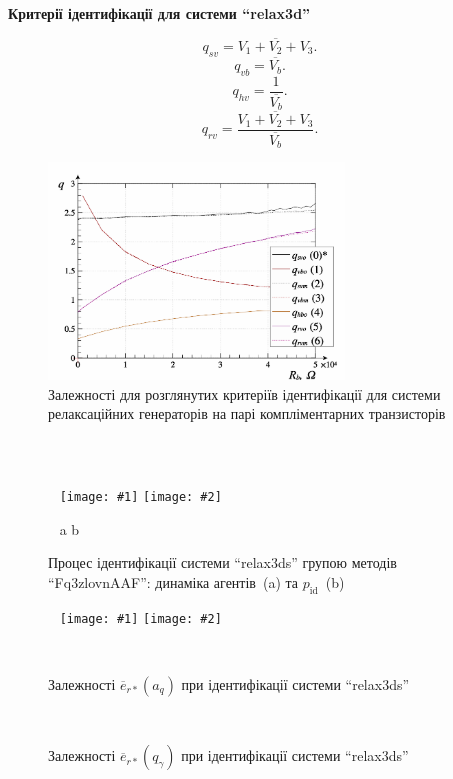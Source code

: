 \documentclass[14pt,handout,utf8]{beamer}
\newlength\DDP
\newcommand{\Xhead}[1]{
 \begin{center}%
      \textbf{#1}%
 \end{center}%
}
\newcommand{\ABlbl}{%
  \vspace{-2.9ex}
  \begin{center}
    ~ \hfill a \hfill\hfill b \hfill ~
  \end{center}
  \vspace{-2.0ex}
}
\newcommand{\PicDouble}[2]{%
 \begin{center}
    ~ \hfill
    \texttt{[image: \#1]}
    \hfill
    \texttt{[image: \#2]}
    \hfill ~
  \end{center}
  \ABlbl
}
\newcommand{\PicDoubleNL}[2]{%
 \begin{center}
    ~ \hfill
    \texttt{[image: \#1]}
    \hfill
    \texttt{[image: \#2]}
    \hfill ~
  \end{center}
}
\newcommand{\TextDouble}[2]{%
 \begin{center}
    ~ \hfill
    \parbox[t]{\DDP}{#1}
    \hfill
    \parbox[t]{\DDP}{#2}
    \hfill ~
  \end{center}
}
\begin{document}
\begin{frame}
  \frametitle{~}

  \Xhead{Критерії ідентифікації для системи ``relax3d''}

\begin{equation}
  q_{sv} = \overline{V_1+V_2+V_3} .
  \label{atu:eq:q_sv_relax}
\end{equation}
%
\begin{equation}
  q_{vb} = \overline{V_b} .
  \label{atu:eq:q_vb_relax}
\end{equation}
%
\begin{equation}
  q_{hv} = \frac{1}{\overline{V_b}} .
  \label{atu:eq:q_hb_relax}
\end{equation}
%
\begin{equation}
  q_{rv} = \frac{\overline{V_1+V_2+V_3}}{\overline{V_b}}.
  \label{atu:eq:q_rv_relax}
\end{equation}

  \begin{figure}
    \includegraphics[width=0.7\textwidth]{../p7/p/relax3d_read_q-p_q1.png}
    \caption{Залежності для розглянутих критеріїв ідентифікації для системи релаксаційних генераторів на парі компліментарних транзисторів}
  \end{figure}


\end{frame}



\begin{frame}
  \frametitle{~}

  \Xhead{}

  \begin{figure}
    \PicDouble{../p7/p/relax3ds_read_id2_0-p_p_cr.png}{../p7/p/relax3ds_read_id2_0-p_pp_cr.png}
    \caption{Процес ідентифікації системи ``relax3ds'' групою методів ``Fq3zlovnAAF'': динаміка агентів~(a) та $p_\mathrm{id}$~(b)}
  \end{figure}

  \begin{figure}
    \PicDoubleNL{../p7/p/relax3ds_read_id2_prm_0-p_a_q.png}{../p7/p/relax3ds_read_id2_prm_0-p_q_gamma.png}
    \TextDouble{\caption{Залежності $\overline{e}_{r *}(a_q)$ при ідентифікації системи ``relax3ds''}}{\caption{Залежності $ \overline{e}_{r *} (q_\gamma) $ при ідентифікації системи ``relax3ds''}}
  \end{figure}


\end{frame}
\end{document}
